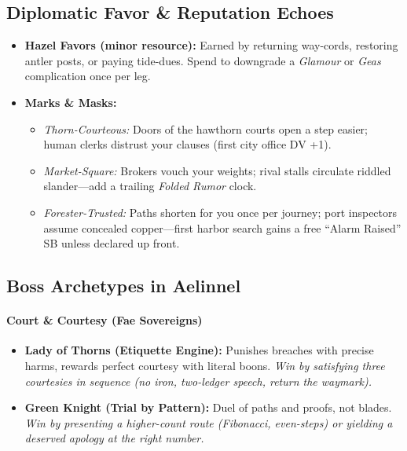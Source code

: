 \subsection*{Diplomatic Favor \& Reputation Echoes}
\begin{itemize}
  \item \textbf{Hazel Favors (minor resource):} Earned by returning way-cords, restoring antler posts, or paying tide-dues. Spend to downgrade a \emph{Glamour} or \emph{Geas} complication once per leg.
  \item \textbf{Marks \& Masks:}
    \begin{itemize}
      \item \emph{Thorn-Courteous:} Doors of the hawthorn courts open a step easier; human clerks distrust your clauses (first city office DV +1).
      \item \emph{Market-Square:} Brokers vouch your weights; rival stalls circulate riddled slander—add a trailing \emph{Folded Rumor} clock.
      \item \emph{Forester-Trusted:} Paths shorten for you once per journey; port inspectors assume concealed copper—first harbor search gains a free “Alarm Raised” SB unless declared up front.
    \end{itemize}
\end{itemize}

\subsection*{Boss Archetypes in Aelinnel}
\label{sec:aelinnel-bosses}

\paragraph{Court \& Courtesy (Fae Sovereigns)}
\begin{itemize}
  \item \textbf{Lady of Thorns (Etiquette Engine):} Punishes breaches with precise harms, rewards perfect courtesy with literal boons. \emph{Win by satisfying three courtesies in sequence (no iron, two-ledger speech, return the waymark).}
  \item \textbf{Green Knight (Trial by Pattern):} Duel of paths and proofs, not blades. \emph{Win by presenting a higher-count route (Fibonacci, even-steps) or yielding a deserved apology at the right number.}
\end{itemize}

